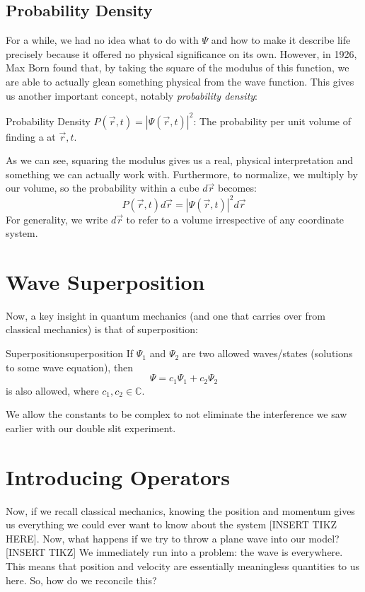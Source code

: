           \subsection{Probability Density}
              For a while, we had no idea what to do with $\Psi$ and how to make it describe life precisely because it offered no physical significance on its own. However, in 1926, Max Born found that, by taking the square of the modulus of this function, we are able to actually glean something physical from the wave function. This gives us another important concept, notably \textit{probability density}:
              \begin{definition}{Probability Density}{}
              $P(\vec{r},t) = |\Psi(\vec{r},t)|^2$: The probability per unit volume of finding a  at $\vec{r},t$.
              \end{definition}
              As we can see, squaring the modulus gives us a real, physical interpretation and something we can actually work with. Furthermore, to normalize, we multiply by our volume, so the probability within a cube $d\vec{r}$ becomes:
              $$P(\vec{r},t)d\vec{r} = |\Psi(\vec{r},t)|^2d\vec{r}$$
              For generality, we write $d\vec{r}$ to refer to a volume irrespective of any coordinate system.

      \section{Wave Superposition}
          Now, a key insight in quantum mechanics (and one that carries over from classical mechanics) is that of superposition:
          \begin{theorem}{Superposition}{superposition}
              If $\Psi_1$ and $\Psi_2$ are two allowed waves/states (solutions to some wave equation), then $$\Psi = c_1\Psi_1 + c_2\Psi_2$$ is also allowed, where $c_1,c_2 \in \mathbb{C}$.
          \end{theorem}
          We allow the constants to be complex to not eliminate the interference we saw earlier with our double slit experiment.

      \section{Introducing Operators}
          Now, if we recall classical mechanics, knowing the position and momentum gives us everything we could ever want to know about the system [INSERT TIKZ HERE]. Now, what happens if we try to throw a plane wave into our model? [INSERT TIKZ] We immediately run into a problem: the wave is everywhere. This means that position and velocity are essentially meaningless quantities to us here. So, how do we reconcile this?

